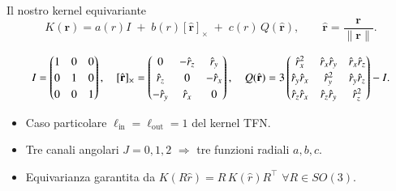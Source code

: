 \documentclass[aspectratio=64,8pt]{beamer}
\begin{document}
\begin{frame}{Il nostro kernel equivariante}
\begin{equation}\nonumber
  K(\mathbf r)=a(r)I\; +\; b(r)[\hat{\mathbf r}]_\times\; +\; c(r)\,Q(\hat{\mathbf r}),
  \qquad \hat{\mathbf r}=\frac{\mathbf r}{\lVert\mathbf r\rVert}.
\end{equation}

\hspace{-20pt}
\begin{equation} \nonumber
    \renewcommand{\arraystretch}{1.2}
I=\begin{pmatrix}1&0&0\\0&1&0\\0&0&1\end{pmatrix}, \quad
[\hat{\mathbf r}]_\times=\begin{pmatrix}0&-\hat r_z&\hat r_y\\\hat r_z&0&-\hat r_x\\-\hat r_y&\hat r_x&0\end{pmatrix}, \quad
Q(\hat{\mathbf r})=3\begin{pmatrix}
 \hat r_x^2 & \hat r_x\hat r_y & \hat r_x\hat r_z\\
 \hat r_y\hat r_x & \hat r_y^2 & \hat r_y\hat r_z\\
 \hat r_z\hat r_x & \hat r_z\hat r_y & \hat r_z^2
\end{pmatrix}-I.
\end{equation}

\vspace{0.5em}
\begin{itemize}
  \item Caso particolare \(\ell_{\text{in}}=\ell_{\text{out}}=1\) del kernel TFN.
  \item Tre canali angolari \(J=0,1,2\) \(\Rightarrow\) tre funzioni radiali \(a,b,c\).
  \item Equivarianza garantita da \(K(R\hat r)=R\,K(\hat r)R^{\!\top}\,\,\forall R\in SO(3).\)
\end{itemize}
\end{frame}
\end{document}
